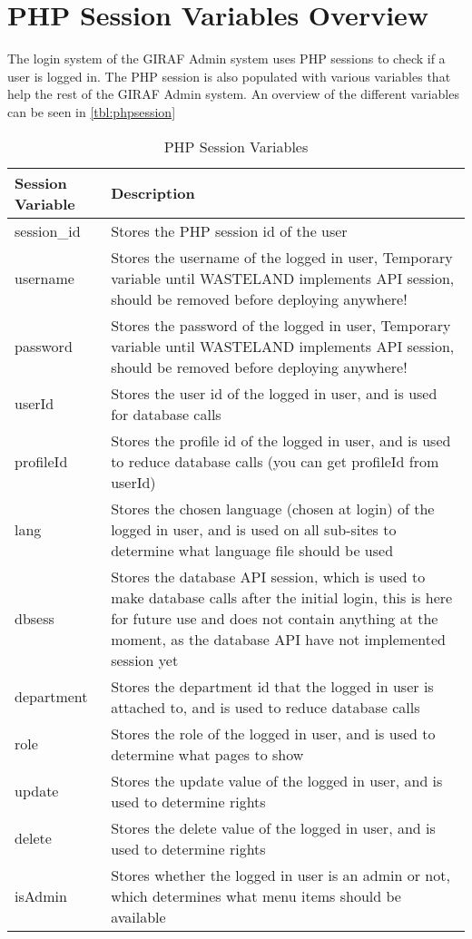 \section{PHP Session Variables Overview}
\label{sec:phpSesion}
The login system of the GIRAF Admin system uses PHP sessions to check if a user is logged in. The PHP session is also populated with various variables that help the rest of the GIRAF Admin system. An overview of the different variables can be seen in \autoref{tbl:phpsession}
\begin{table}[h]
\begin{tabularx}{\linewidth}{| l | X |}
\hline
Session Variable & Description \\ \hline
session\_id & Stores the PHP session id of the user \\ \hline
username & Stores the username of the logged in user, {\color{red} Temporary variable until WASTELAND implements API session, should be removed before deploying anywhere!} \\ \hline
password & Stores the password of the logged in user, {\color{red} Temporary variable until WASTELAND implements API session, should be removed before deploying anywhere!} \\ \hline
userId & Stores the user id of the logged in user, and is used for database calls \\ \hline
profileId & Stores the profile id of the logged in user, and is used to reduce database calls (you can get profileId from userId) \\ \hline
lang & Stores the chosen language (chosen at login) of the logged in user, and is used on all sub-sites to determine what language file should be used \\ \hline
dbsess & Stores the database API session, which is used to make database calls after the initial login, {\color{red} this is here for future use and does not contain anything at the moment, as the database API have not implemented session yet} \\ \hline
department & Stores the department id that the logged in user is attached to, and is used to reduce database calls \\ \hline
role & Stores the role of the logged in user, and is used to determine what pages to show \\ \hline
update & Stores the update value of the logged in user, and is used to determine rights \\ \hline
delete & Stores the delete value of the logged in user, and is used to determine rights \\ \hline
isAdmin & Stores whether the logged in user is an admin or not, which determines what menu items should be available \\
\hline
\end{tabularx}
\caption{PHP Session Variables}
\label{tbl:phpsession}
\end{table}
